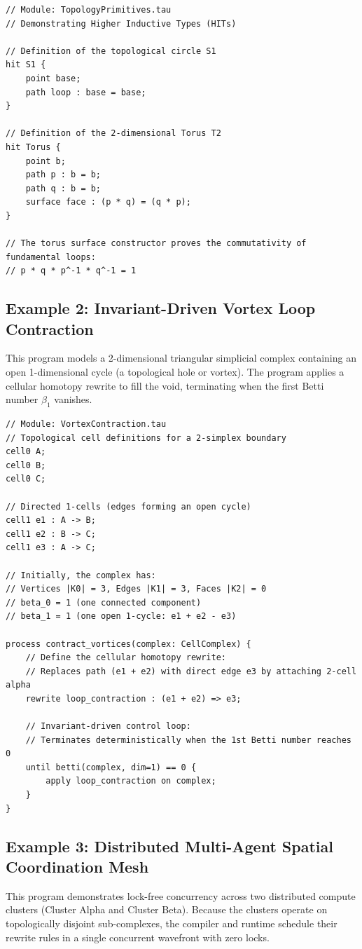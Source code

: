 \begin{lstlisting}[caption={Higher Inductive Types for Circle $S^1$ and Torus $T^2$ in \ToposLang{}.}]
// Module: TopologyPrimitives.tau
// Demonstrating Higher Inductive Types (HITs)

// Definition of the topological circle S1
hit S1 {
    point base;
    path loop : base = base;
}

// Definition of the 2-dimensional Torus T2
hit Torus {
    point b;
    path p : b = b;
    path q : b = b;
    surface face : (p * q) = (q * p);
}

// The torus surface constructor proves the commutativity of fundamental loops:
// p * q * p^-1 * q^-1 = 1
\end{lstlisting}

\subsection{Example 2: Invariant-Driven Vortex Loop Contraction}
This program models a 2-dimensional triangular simplicial complex containing an open 1-dimensional cycle (a topological hole or vortex). The program applies a cellular homotopy rewrite to fill the void, terminating when the first Betti number $\beta_1$ vanishes.

\begin{lstlisting}[caption={Invariant-Driven Vortex Contraction on a 2-Simplex.}]
// Module: VortexContraction.tau
// Topological cell definitions for a 2-simplex boundary
cell0 A;
cell0 B;
cell0 C;

// Directed 1-cells (edges forming an open cycle)
cell1 e1 : A -> B;
cell1 e2 : B -> C;
cell1 e3 : A -> C;

// Initially, the complex has:
// Vertices |K0| = 3, Edges |K1| = 3, Faces |K2| = 0
// beta_0 = 1 (one connected component)
// beta_1 = 1 (one open 1-cycle: e1 + e2 - e3)

process contract_vortices(complex: CellComplex) {
    // Define the cellular homotopy rewrite:
    // Replaces path (e1 + e2) with direct edge e3 by attaching 2-cell alpha
    rewrite loop_contraction : (e1 + e2) => e3;

    // Invariant-driven control loop:
    // Terminates deterministically when the 1st Betti number reaches 0
    until betti(complex, dim=1) == 0 {
        apply loop_contraction on complex;
    }
}
\end{lstlisting}

\subsection{Example 3: Distributed Multi-Agent Spatial Coordination Mesh}
This program demonstrates lock-free concurrency across two distributed compute clusters (Cluster Alpha and Cluster Beta). Because the clusters operate on topologically disjoint sub-complexes, the \ToposLang{} compiler and runtime schedule their rewrite rules in a single concurrent wavefront with zero locks.

